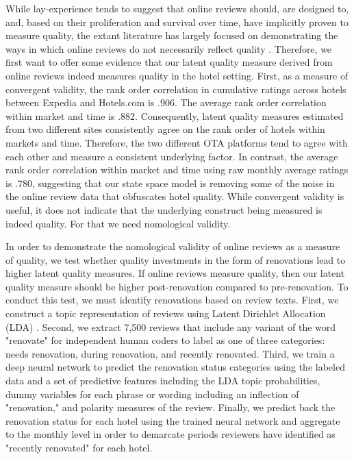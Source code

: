 \documentclass{informs_mod} %
\begin{document}
While lay-experience tends to suggest that online reviews should, are designed to, and, based on their proliferation and survival over time, have implicitly proven to measure quality, the extant literature has largely focused on demonstrating the ways in which online reviews do not necessarily reflect quality \citep{mcauley2013amateurs, moe2012online, mayzlin2014promotional}. Therefore, we first want to offer some evidence that our latent quality measure derived from online reviews indeed measures quality in the hotel setting. First, as a measure of convergent validity, the rank order correlation in cumulative ratings across hotels between Expedia and Hotels.com is .906. The average rank order correlation within market and time is .882. Consequently, latent quality measures estimated from two different sites consistently agree on the rank order of hotels within markets and time. Therefore, the two different OTA platforms tend to agree with each other and measure a consistent underlying factor. In contrast, the average rank order correlation within market and time using raw monthly average ratings is .780, suggesting that our state space model is removing some of the noise in the online review data that obfuscates hotel quality.  While convergent validity is useful, it does not indicate that the underlying construct being measured is indeed quality. For that we need nomological validity.

In order to demonstrate the nomological validity of online reviews as a measure of quality, we test whether quality investments in the form of renovations lead to higher latent quality measures. If online reviews measure quality, then our latent quality measure should be higher post-renovation compared to pre-renovation. To conduct this test, we must identify renovations based on review texts. First, we construct a topic representation of reviews using Latent Dirichlet Allocation (LDA) \citep{blei2003latent, wang2018and}. Second, we extract 7,500 reviews that include any variant of the word "renovate" for independent human coders to label as one of three categories: needs renovation, during renovation, and recently renovated. Third, we train a deep neural network to predict the renovation status categories using the labeled data and a set of predictive features including the LDA topic probabilities, dummy variables for each phrase or wording including an inflection of "renovation," and polarity measures of the review. Finally, we predict back the renovation status for each hotel using the trained neural network and aggregate to the monthly level in order to demarcate periods reviewers have identified as "recently renovated" for each hotel.%
\end{document}
